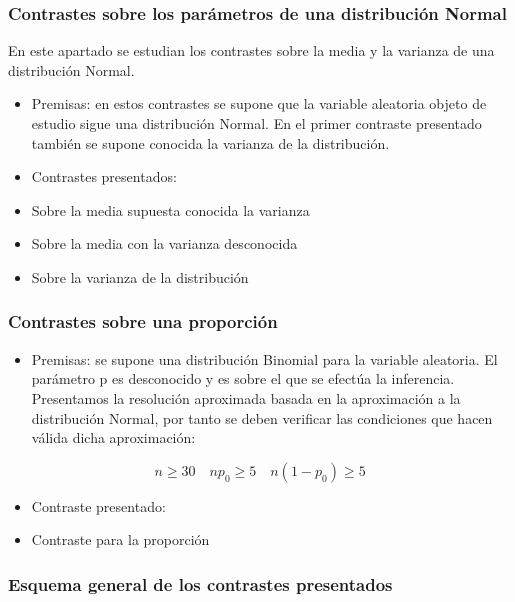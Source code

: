 \documentclass[
]{article}
\providecommand{\tightlist}{%
  \setlength{\itemsep}{0pt}\setlength{\parskip}{0pt}}
\begin{document}
\subsubsection{Contrastes sobre los parámetros de una distribución Normal}\label{contrastes-sobre-los-paruxe1metros-de-una-distribuciuxf3n-normal}

En este apartado se estudian los contrastes sobre la media y la varianza de una distribución Normal.

\begin{itemize}
\tightlist
\item
  Premisas: en estos contrastes se supone que la variable aleatoria objeto de estudio sigue una distribución Normal. En el primer contraste presentado también se supone conocida la varianza de la distribución.
\item
  Contrastes presentados:
\item
  Sobre la media supuesta conocida la varianza
\item
  Sobre la media con la varianza desconocida
\item
  Sobre la varianza de la distribución
\end{itemize}

\subsubsection{Contrastes sobre una proporción}\label{contrastes-sobre-una-proporciuxf3n}

\begin{itemize}
\tightlist
\item
  Premisas: se supone una distribución Binomial para la variable aleatoria. El parámetro p es desconocido y es sobre el que se efectúa la inferencia. Presentamos la resolución aproximada basada en la aproximación a la distribución Normal, por tanto se deben verificar las condiciones que hacen válida dicha aproximación:
\end{itemize}

\[
n \geq 30 \quad n p_{0} \geq 5 \quad n\left(1-p_{0}\right) \geq 5
\]

\begin{itemize}
\tightlist
\item
  Contraste presentado:
\item
  Contraste para la proporción
\end{itemize}

\subsubsection{Esquema general de los contrastes presentados}\label{esquema-general-de-los-contrastes-presentados}
\end{document}
